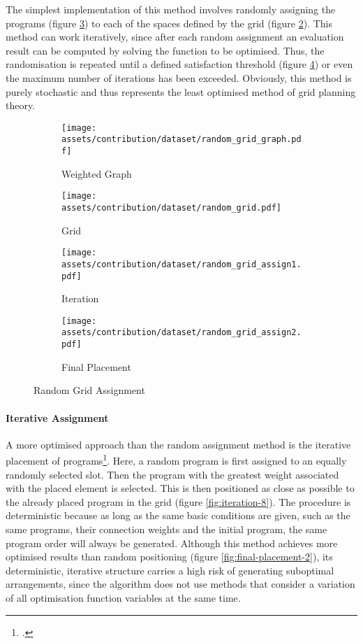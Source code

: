 \documentclass[a4paper, 12pt]{report}
\begin{document}
The simplest implementation of this method involves randomly assigning the programs (figure \ref{fig:iteration-6}) to each of the spaces defined by the grid (figure \ref{fig:grid-1}). This method can work iteratively, since after each random assignment an evaluation result can be computed by solving the function to be optimised. Thus, the randomisation is repeated until a defined satisfaction threshold (figure \ref{fig:final-placement-1}) or even the maximum number of iterations has been exceeded. Obviously, this method is purely \gls{stochastic} and thus represents the least optimised method of grid planning theory.

\begin{figure}
\centering
\begin{subfigure}{.25\textwidth}
\centering
\texttt{[image: assets/contribution/dataset/random\_grid\_graph.pdf]}
\caption{Weighted Graph}
\label{fig:weighted-graph-1}
\end{subfigure}%
\begin{subfigure}{.25\textwidth}
\centering
\texttt{[image: assets/contribution/dataset/random\_grid.pdf]}
\caption{Grid}
\label{fig:grid-1}
\end{subfigure}%
\begin{subfigure}{.25\textwidth}
\centering
\texttt{[image: assets/contribution/dataset/random\_grid\_assign1.pdf]}
\caption{Iteration}
\label{fig:iteration-6}
\end{subfigure}%
\begin{subfigure}{.25\textwidth}
\centering
\texttt{[image: assets/contribution/dataset/random\_grid\_assign2.pdf]}
\caption{Final Placement}
\label{fig:final-placement-1}
\end{subfigure}
\caption{Random Grid Assignment}
\label{fig:random-grid-assignment}
\end{figure}

\paragraph{Iterative Assignment}\label{par:iterative-assignment}

A more optimised approach than the random assignment method is the iterative placement of programs\footcite{egor2020computer}. Here, a random program is first assigned to an equally randomly selected slot. Then the program with the greatest weight associated with the placed element is selected. This is then positioned as close as possible to the already placed program in the grid (figure \ref{fig:iteration-8}). The procedure is \gls{deterministic} because as long as the same basic conditions are given, such as the same programs, their connection weights and the initial program, the same program order will always be generated. Although this method achieves more optimised results than random positioning (figure \ref{fig:final-placement-2}), its \gls{deterministic}, iterative structure carries a high risk of generating suboptimal arrangements, since the algorithm does not use methods that consider a variation of all optimisation function variables at the same time.
\end{document}
